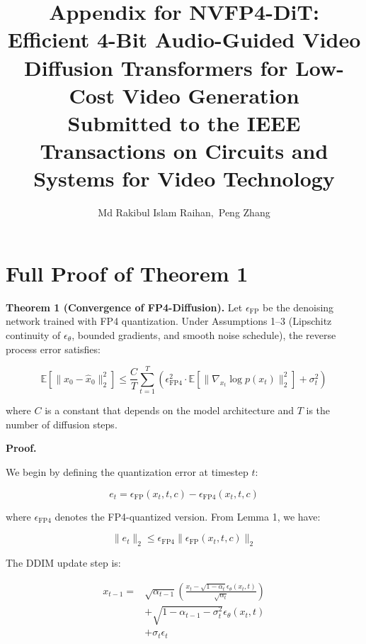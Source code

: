 \documentclass[journal,twoside]{IEEEtran}
\theoremstyle{definition}
\theoremstyle{remark}
\newcommand{\EE}{\mathbb{E}}
\begin{document}
\title{Appendix for NVFP4-DiT: Efficient 4-Bit Audio-Guided Video Diffusion Transformers for Low-Cost Video Generation \\ {\small Submitted to the IEEE Transactions on Circuits and Systems for Video Technology}}

\author{Md Rakibul Islam Raihan,~Peng Zhang}

\maketitle

\appendices

\section{Full Proof of Theorem 1}
\label{app:a}

\textbf{Theorem 1 (Convergence of FP4-Diffusion).}
Let $\epsilon_{\text{FP}}$ be the denoising network trained with FP4 quantization. Under Assumptions 1--3 (Lipschitz continuity of $\epsilon_\theta$, bounded gradients, and smooth noise schedule), the reverse process error satisfies:

\[
\EE[\|x_0 - \hat{x}_0\|_2^2] \leq \frac{C}{T} \sum_{t=1}^T \left( \epsilon_{\text{FP4}}^2 \cdot \EE[\|\nabla_{x_t} \log p(x_t)\|_2^2] + \sigma_t^2 \right)
\]

where $C$ is a constant that depends on the model architecture and $T$ is the number of diffusion steps.

\textbf{Proof.}

We begin by defining the quantization error at timestep $t$:

\[
e_t = \epsilon_{\text{FP}}(x_t, t, c) - \epsilon_{\text{FP4}}(x_t, t, c)
\]

where $\epsilon_{\text{FP4}}$ denotes the FP4-quantized version. From Lemma 1, we have:

\[
\|e_t\|_2 \leq \epsilon_{\text{FP4}} \|\epsilon_{\text{FP}}(x_t, t, c)\|_2
\]

The DDIM update step is:

\begin{equation}
\begin{split}
x_{t-1} = &\sqrt{\alpha_{t-1}} \left( \frac{x_t - \sqrt{1-\alpha_t} \epsilon_\theta(x_t, t)}{\sqrt{\alpha_t}} \right) \\
&+ \sqrt{1-\alpha_{t-1} - \sigma_t^2} \epsilon_\theta(x_t, t) \\
&+ \sigma_t \epsilon_t
\end{split}
\end{equation}
\end{document}
